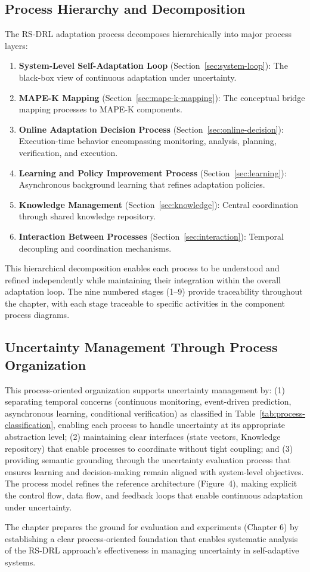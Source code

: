 \documentclass[11pt,a4paper]{article}
\begin{document}
\subsection{Process Hierarchy and Decomposition}

The RS-DRL adaptation process decomposes hierarchically into major process layers:

\begin{enumerate}
    \item \textbf{System-Level Self-Adaptation Loop} (Section~\ref{sec:system-loop}): The black-box view of continuous adaptation under uncertainty.
    \item \textbf{MAPE-K Mapping} (Section~\ref{sec:mape-k-mapping}): The conceptual bridge mapping processes to MAPE-K components.
    \item \textbf{Online Adaptation Decision Process} (Section~\ref{sec:online-decision}): Execution-time behavior encompassing monitoring, analysis, planning, verification, and execution.
    \item \textbf{Learning and Policy Improvement Process} (Section~\ref{sec:learning}): Asynchronous background learning that refines adaptation policies.
    \item \textbf{Knowledge Management} (Section~\ref{sec:knowledge}): Central coordination through shared knowledge repository.
    \item \textbf{Interaction Between Processes} (Section~\ref{sec:interaction}): Temporal decoupling and coordination mechanisms.
\end{enumerate}

This hierarchical decomposition enables each process to be understood and refined independently while maintaining their integration within the overall adaptation loop. The nine numbered stages (1--9) provide traceability throughout the chapter, with each stage traceable to specific activities in the component process diagrams.

\subsection{Uncertainty Management Through Process Organization}

This process-oriented organization supports uncertainty management by: (1) separating temporal concerns (continuous monitoring, event-driven prediction, asynchronous learning, conditional verification) as classified in Table~\ref{tab:process-classification}, enabling each process to handle uncertainty at its appropriate abstraction level; (2) maintaining clear interfaces (state vectors, Knowledge repository) that enable processes to coordinate without tight coupling; and (3) providing semantic grounding through the uncertainty evaluation process that ensures learning and decision-making remain aligned with system-level objectives. The process model refines the reference architecture (Figure~4), making explicit the control flow, data flow, and feedback loops that enable continuous adaptation under uncertainty.

The chapter prepares the ground for evaluation and experiments (Chapter 6) by establishing a clear process-oriented foundation that enables systematic analysis of the RS-DRL approach's effectiveness in managing uncertainty in self-adaptive systems.
\end{document}
